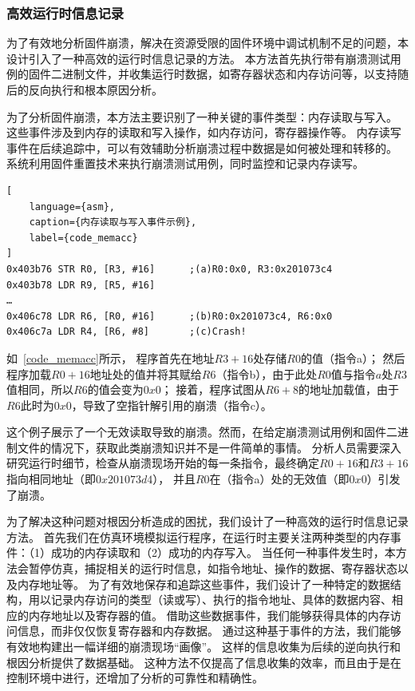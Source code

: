 \subsubsection{高效运行时信息记录}
为了有效地分析固件崩溃，解决在资源受限的固件环境中调试机制不足的问题，本设计引入了一种高效的运行时信息记录的方法。
本方法首先执行带有崩溃测试用例的固件二进制文件，并收集运行时数据，如寄存器状态和内存访问等，以支持随后的反向执行和根本原因分析。

为了分析固件崩溃，本方法主要识别了一种关键的事件类型：内存读取与写入。
这些事件涉及到内存的读取和写入操作，如内存访问，寄存器操作等。
内存读写事件在后续追踪中，可以有效辅助分析崩溃过程中数据是如何被处理和转移的。
系统利用固件重置技术来执行崩溃测试用例，同时监控和记录内存读写。
\begin{lstlisting}[
    language={asm},
    caption={内存读取与写入事件示例},
    label={code_memacc}
]
0x403b76 STR R0, [R3, #16]      ;(a)R0:0x0, R3:0x201073c4
0x403b78 LDR R9, [R5, #16]
…
0x406c78 LDR R6, [R0, #16]      ;(b)R0:0x201073c4, R6:0x0
0x406c7a LDR R4, [R6, #8]       ;(c)Crash!
\end{lstlisting}

如~\autoref{code_memacc}所示， 程序首先在地址$R3 + 16$处存储$R0$的值（指令a）；
然后程序加载$R0 + 16$地址处的值并将其赋给$R6$（指令b），由于此处$R0$值与指令$a$处$R3$值相同，所以$R6$的值会变为$0x0$；
接着，程序试图从$R6 + 8$的地址加载值，由于$R6$此时为$0x0$，导致了空指针解引用的崩溃（指令c）。

这个例子展示了一个无效读取导致的崩溃。然而，在给定崩溃测试用例和固件二进制文件的情况下，获取此类崩溃知识并不是一件简单的事情。
分析人员需要深入研究运行时细节，检查从崩溃现场开始的每一条指令，最终确定$R0 + 16$和$R3 + 16$指向相同地址（即$0x201073d4$），
并且$R0$在（指令a）处的无效值（即$0x0$）引发了崩溃。

为了解决这种问题对根因分析造成的困扰，我们设计了一种高效的运行时信息记录方法。
首先我们在仿真环境模拟运行程序，在运行时主要关注两种类型的内存事件：（1）成功的内存读取和（2）成功的内存写入。
当任何一种事件发生时，本方法会暂停仿真，捕捉相关的运行时信息，如指令地址、操作的数据、寄存器状态以及内存地址等。
为了有效地保存和追踪这些事件，我们设计了一种特定的数据结构，用以记录内存访问的类型（读或写）、执行的指令地址、具体的数据内容、相应的内存地址以及寄存器的值。
借助这些数据事件，我们能够获得具体的内存访问信息，而非仅仅恢复寄存器和内存数据。
通过这种基于事件的方法，我们能够有效地构建出一幅详细的崩溃现场“画像”。
这样的信息收集为后续的逆向执行和根因分析提供了数据基础。
这种方法不仅提高了信息收集的效率，而且由于是在控制环境中进行，还增加了分析的可靠性和精确性。

